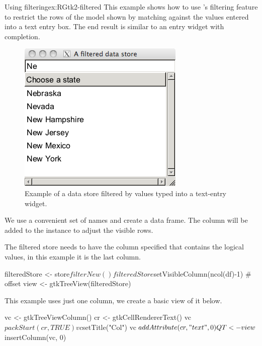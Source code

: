 \begin{example}{Using filtering}{ex:RGtk2-filtered}
This example shows how to use \GTK's filtering feature to restrict the rows of the model shown by matching against the values entered into a text entry box. The end result is similar to an entry widget with completion.

\begin{figure}
  \centering
  \includegraphics[width=.45\textwidth]{ex-RGtk2-filtered}
  \caption{Example of a data store filtered by values typed into a text-entry widget.}
  \label{fig:RGtk2-filtered}
\end{figure}

We use a convenient set of names and create a data frame. The
 column will be added to the 
instance to adjust the visible rows.
\begin{Schunk}
\end{Schunk}

The filtered store needs to have the column specified that contains
the logical values, in this example it is the last column.
\begin{Schunk}
\begin{Sinput}
 filteredStore <- store$filterNew()
 filteredStore$setVisibleColumn(ncol(df)-1)      # offset
 view <- gtkTreeView(filteredStore)
\end{Sinput}
\end{Schunk}

This example uses just one column, we create a basic view of it below.
\begin{Schunk}
\begin{Sinput}
 vc <- gtkTreeViewColumn()
 cr <- gtkCellRendererText()
 vc$packStart(cr, TRUE)
 vc$setTitle("Col")
 vc$addAttribute(cr, "text", 0)
 QT <- view$insertColumn(vc, 0)
\end{Sinput}
\end{Schunk}


\end{example}
